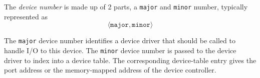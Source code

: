 \begin{definition}\label{def:Device_Number}
  The \emph{device number} is made up of 2 parts, a \texttt{major} and \texttt{minor} number, typically represented as
  \begin{equation*}
    \langle \mathtt{major}, \mathtt{minor} \rangle
  \end{equation*}

  The \texttt{major} device number identifies a device driver that should be called to handle I/O to this device.
  The \texttt{minor} device number  is passed to the device driver to index into a device table.
  The corresponding device-table entry gives the port address or the memory-mapped address of the device controller.
\end{definition}


